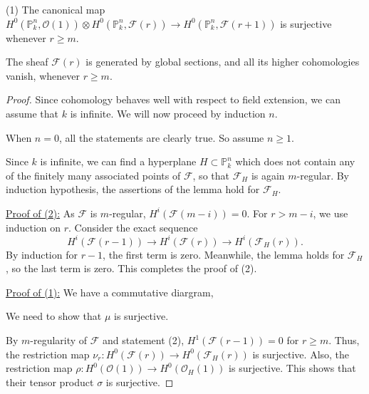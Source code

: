 \documentclass[ignorenonframetext,t]{beamer}
\newcommand{\sF}{{\mathcal F}}
\newcommand{\sO}{{\mathcal O}}
\renewcommand{\P}{{\mathbb P}}
\theoremstyle{definition}
\begin{document}
\begin{frame}
	(1) The canonical map $H^0(\P^n_k,\sO(1)) \otimes H^0(\P^n_k,\sF(r)) \rightarrow H^0(\P^n_k,\sF(r+1))$ is surjective whenever $r\geq m$.
\end{frame}

\begin{frame}
	\item The sheaf $\sF(r)$ is generated by global sections, and all its higher cohomologies vanish, whenever $r\geq m$.
\end{frame}


\begin{proof}
	Since cohomology behaves well with respect to field extension, we can assume that $k$ is infinite. We will now proceed by induction $n$.
	
	When $n=0$, all the statements are clearly true. So assume $n\geq 1$.
	
	Since $k$ is infinite, we can find a hyperplane $H\subset \P^n_k$ which does not contain any of the finitely many associated points of $\sF$, so that $\sF_H$ is again $m$-regular. By induction hypothesis, the assertions of the lemma hold for $\sF_H$.
	
	\noindent\underline{Proof of (2):} As $\sF$ is $m$-regular, $H^i(\sF(m-i))=0$. For $r> m-i$, we use induction on $r$. Consider the exact sequence
	\[H^i(\sF(r-1))\rightarrow H^i(\sF(r))\rightarrow H^i(\sF_H(r)).\]
	By induction for $r-1$, the first term is zero. Meanwhile, the lemma holds for $\sF_H$, so the last term is zero. This completes the proof of (2).
	
	\noindent\underline{Proof of (1):} We have a commutative diargram,
	\begin{center}
	\end{center}
	We need to show that $\mu$ is surjective.
	
	By $m$-regularity of $\sF$ and statement (2), $H^1(\sF(r-1))=0$ for $r\geq m$. Thus, the restriction map $\nu_r: H^0(\sF(r))\rightarrow H^0(\sF_H(r))$ is surjective. Also, the restriction map $\rho: H^0(\sO(1))\rightarrow H^0(\sO_H(1))$ is surjective. This shows that their tensor product $\sigma$ is surjective.
	

\end{proof}
\end{document}
